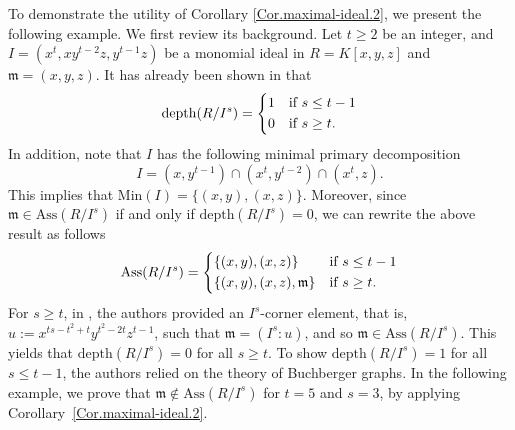 \documentclass[11pt]{amsart}
\begin{document}
To demonstrate the utility of  Corollary \ref{Cor.maximal-ideal.2},  we present   the following  example. We first review  its background. 
Let $t\geq 2$ be an integer, and  $I=(x^t, xy^{t-2}z, y^{t-1}z)$ be a monomial ideal in $R=K[x,y,z]$ and $\mathfrak{m}=(x,y,z)$.   It has already been shown in
 \cite[Proposition 2.5]{MST} that 
  \[
\mathrm{depth}(R/I^s) =
    \begin{dcases}
    1 & \text{if }  s \leq t-1 \\
   0   & \text{if } s \geq t. \\
                \end{dcases}
\]
  In addition, note that  $I$ has the following minimal primary  decomposition 
 $$I=(x,y^{t-1}) \cap (x^t, y^{t-2}) \cap (x^t,z).$$  This implies that $\mathrm{Min}(I)= \{(x,y), (x,z)\}.$ Moreover,  since  $\mathfrak{m}\in \mathrm{Ass}(R/I^s)$  if and  only if $\mathrm{depth}(R/I^s)=0$,  we can rewrite the above result as follows 
  \[
\mathrm{Ass}(R/I^s) =
    \begin{dcases}
    \{(x,y), (x,z)\} & \text{if } s \leq t-1 \\
\{(x,y), (x,z), \mathfrak{m}\}  & \text{if } s \geq t. \\
                \end{dcases}
\]
For $s\geq t$, in  \cite[Proposition 2.5]{MST}, the authors provided an $I^s$-corner element, that is, $u:=x^{ts-t^2+t}y^{t^2-2t}z^{t-1}$, such that  
$\mathfrak{m}=(I^s:u)$, and so $\mathfrak{m}\in \mathrm{Ass}(R/I^s)$. This yields that $\mathrm{depth}(R/I^s)=0$ for all  $s\geq t$. 
To show $\mathrm{depth}(R/I^s)=1$  for all $s\leq t-1$, the authors relied on the theory of Buchberger graphs.  
In the following example, we prove that $\mathfrak{m} \notin \mathrm{Ass}(R/I^s)$ for $t = 5$ and $s = 3$, by applying Corollary~\ref{Cor.maximal-ideal.2}.
\end{document}
